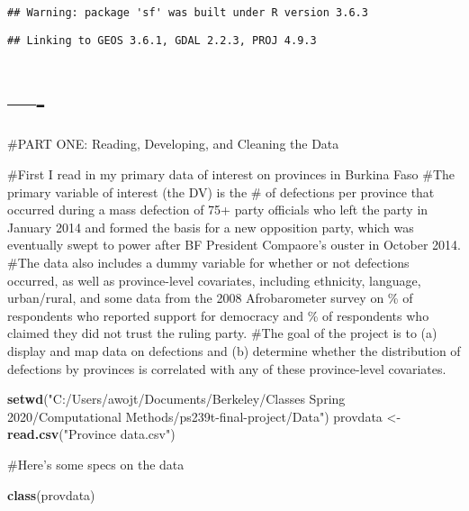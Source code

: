 \documentclass[]{article}
\newenvironment{Shaded}{\begin{snugshade}}{\end{snugshade}}
\newcommand{\KeywordTok}[1]{\textcolor[rgb]{0.13,0.29,0.53}{\textbf{#1}}}
\newcommand{\NormalTok}[1]{#1}
\newcommand{\StringTok}[1]{\textcolor[rgb]{0.31,0.60,0.02}{#1}}
\begin{document}
\begin{verbatim}
## Warning: package 'sf' was built under R version 3.6.3
\end{verbatim}

\begin{verbatim}
## Linking to GEOS 3.6.1, GDAL 2.2.3, PROJ 4.9.3
\end{verbatim}

\hypertarget{section}{%
\section{----}\label{section}}

\#PART ONE: Reading, Developing, and Cleaning the Data

\#First I read in my primary data of interest on provinces in Burkina
Faso \#The primary variable of interest (the DV) is the \# of defections
per province that occurred during a mass defection of 75+ party
officials who left the party in January 2014 and formed the basis for a
new opposition party, which was eventually swept to power after BF
President Compaore's ouster in October 2014. \#The data also includes a
dummy variable for whether or not defections occurred, as well as
province-level covariates, including ethnicity, language, urban/rural,
and some data from the 2008 Afrobarometer survey on \% of respondents
who reported support for democracy and \% of respondents who claimed
they did not trust the ruling party. \#The goal of the project is to (a)
display and map data on defections and (b) determine whether the
distribution of defections by provinces is correlated with any of these
province-level covariates.

\begin{Shaded}
\begin{Highlighting}[]
\KeywordTok{setwd}\NormalTok{(}\StringTok{"C:/Users/awojt/Documents/Berkeley/Classes Spring 2020/Computational Methods/ps239t{-}final{-}project/Data"}\NormalTok{)}
\NormalTok{provdata <{-}}\StringTok{ }\KeywordTok{read.csv}\NormalTok{(}\StringTok{"Province data.csv"}\NormalTok{)}
\end{Highlighting}
\end{Shaded}

\#Here's some specs on the data

\begin{Shaded}
\begin{Highlighting}[]
\KeywordTok{class}\NormalTok{(provdata)}
\end{Highlighting}
\end{Shaded}
\end{document}
